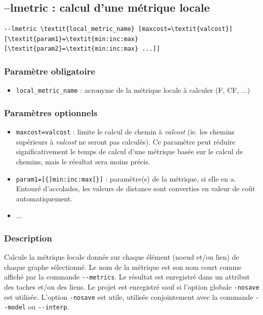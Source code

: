 \documentclass[a4paper,10pt]{report}
\begin{document}
\subsection{--lmetric : calcul d'une métrique locale}
\begin{Verbatim}[commandchars=\\\{\}]
--lmetric \textit{local_metric_name} [maxcost=\textit{valcost}] [\textit{param1}=\textit{min:inc:max} [\textit{param2}=\textit{min:inc:max} ...]] 
\end{Verbatim}

\subsubsection{Paramètre obligatoire}
\begin{itemize}
	\item \verb|local_metric_name| : acronyme de la métrique locale à calculer (F, CF, ...)
\end{itemize}

\subsubsection{Paramètres optionnels}
\begin{itemize}
	\item \verb|maxcost=valcost| : limite le calcul de chemin à \textit{valcost} (ie. les chemins supérieurs à \textit{valcost} ne seront pas calculés). Ce paramètre peut réduire significativement le temps de calcul d'une métrique basée sur le calcul de chemins, mais le résultat sera moins précis.
	\item \verb|param1=[{]min:inc:max[}]| : paramètre(s) de la métrique, si elle en a. Entouré d'accolades, les valeurs de distance sont converties en valeur de coût automatiquement.
	\item ...
\end{itemize}

\subsubsection{Description}
Calcule la métrique locale donnée sur chaque élément (noeud et/ou lien) de chaque graphe sélectionné.
Le nom de la métrique est son nom court comme affiché par la commande \verb|--metrics|.
Le résultat est enregistré dans un attribut des taches et/ou des liens. Le projet est enregistré sauf si l'option globale \verb|-nosave| est utilisée. L'option \verb|-nosave| est utile, utilisée conjointement avec la commande \verb|--model| ou \verb|--interp|.
\end{document}
